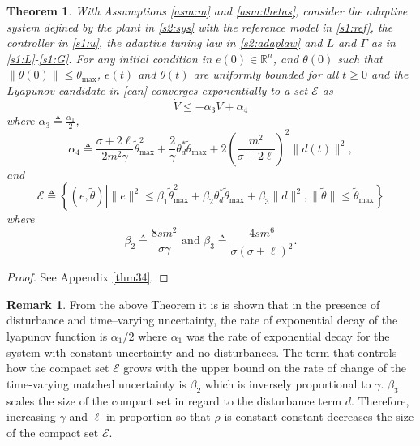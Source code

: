 \documentclass[10pt,journal]{IEEEtran}
\theoremstyle{plain}%
\newtheorem{thm}{Theorem}%
\theoremstyle{definition}
\newtheorem{rem}{Remark}
\newcommand{\be}[0]{\begin{equation}}
\newcommand{\ee}[0]{\end{equation}}
\newcommand{\ben}[0]{\begin{equation*}}
\newcommand{\een}[0]{\end{equation*}}
\newcommand{\norms}[1]{\lVert#1\rVert}
\newcommand{\normB}[0]{\norms}
\let\norm=\normB
\renewcommand{\Re}[0]{\mathbb R}
\renewcommand{\IEEEQED}{\IEEEQEDopen}
\begin{document}
\begin{thm}\label{lem:s2}
With Assumptions \ref{asm:m} and \ref{asm:thetas}, consider the adaptive system defined by the plant in \eqref{s2:sys} with the reference model in \eqref{s1:ref}, the controller in \eqref{s1:u}, the adaptive tuning law in \eqref{s2:adaplaw} and $L$ and $\Gamma$ as in \eqref{s1:L}-\eqref{s1:G}. For any initial condition in $e(0)\in \Re^n$, and $\theta(0)$ such that $\norm{\theta(0)}\leq\theta_\text{max}$, $e(t)$ and $\theta(t)$ are uniformly bounded for all $t\geq0$ and the Lyapunov candidate in \eqref{can} converges exponentially to a set $\mathcal E$ as\be
\dot V \leq - \alpha_3 V + \alpha_4
\ee 
where $ \alpha_3  \triangleq \frac{\alpha_1}{2}$,
\be\label{alpha4}
\alpha_4  \triangleq  \frac {\sigma+2\ell} {2m^2 \gamma} \tilde\theta_\text{max}^2 + \frac {2} \gamma \theta^*_d\tilde \theta_\text{max}  +2 \left(\frac{m^2}{\sigma+2\ell}\right) ^2 \norm {d(t)}^2,
\ee
and\ben
\mathcal E \triangleq \left\{ (e,\tilde\theta) \left| \norm e^2 \leq \beta_1  \tilde\theta_\text{max}^2 + \beta_2\theta^*_d\tilde\theta_\text{max} +\beta_3 \norm d^2,\right.
  \norm {\tilde \theta} \leq \tilde\theta_\text{max} \right\}
\een
where 
\be\label{b2}
\beta_2 \triangleq \frac{8s m^2}{ \sigma \gamma }  \text{ and } \beta_3 \triangleq  \frac{4 s m^6}{\sigma (\sigma+\ell)^2}.
\ee
\end{thm}
\begin{proof}See Appendix \ref{thm34}. \let\IEEEQED\relax \end{proof}

\begin{rem}
From the above Theorem it is is shown that in the presence of disturbance and time--varying uncertainty, the rate of exponential decay of the lyapunov function is $\alpha_1/2$ where $\alpha_1$ was the rate of exponential decay for the system with constant uncertainty and no disturbances. The term that controls how the compact set $\mathcal E$ grows with the upper bound on the rate of change of the time-varying matched uncertainty is $\beta_2$ which is inversely proportional to $\gamma$. $\beta_3$ scales the size of the compact set in regard to the disturbance term $d$. Therefore, increasing $\gamma$ and $\ell$ in proportion so that  $\rho$ is constant constant decreases the size of the compact set $\mathcal E$.
\end{rem}
\end{document}
